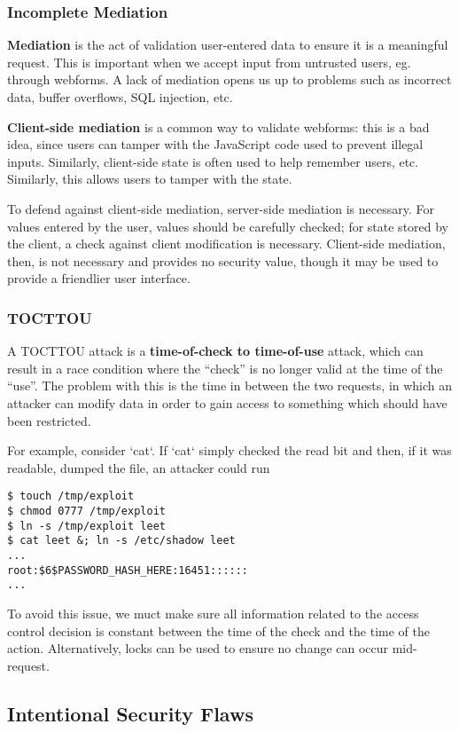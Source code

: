 \documentclass[12pt]{article}
\begin{document}
\subsubsection{Incomplete Mediation}
{\bf Mediation} is the act of validation user-entered data to ensure it is a meaningful request. This is important when we accept input from untrusted users, eg. through webforms. A lack of mediation opens us up to problems such as incorrect data, buffer overflows, SQL injection, etc.

{\bf Client-side mediation} is a common way to validate webforms: this is a bad idea, since users can tamper with the JavaScript code used to prevent illegal inputs. Similarly, client-side state is often used to help remember users, etc. Similarly, this allows users to tamper with the state.

To defend against client-side mediation, server-side mediation is necessary. For values entered by the user, values should be carefully checked; for state stored by the client, a check against client modification is necessary. Client-side mediation, then, is not necessary and provides no security value, though it may be used to provide a friendlier user interface.

\subsubsection{TOCTTOU}
A TOCTTOU attack is a {\bf time-of-check to time-of-use} attack, which can result in a race condition where the ``check'' is no longer valid at the time of the ``use''. The problem with this is the time in between the two requests, in which an attacker can modify data in order to gain access to something which should have been restricted.

For example, consider `cat`. If `cat` simply checked the read bit and then, if it was readable, dumped the file, an attacker could run

\begin{verbatim}
$ touch /tmp/exploit
$ chmod 0777 /tmp/exploit
$ ln -s /tmp/exploit leet
$ cat leet &; ln -s /etc/shadow leet
...
root:$6$PASSWORD_HASH_HERE:16451::::::
...
\end{verbatim}

To avoid this issue, we muct make sure all information related to the access control decision is constant between the time of the check and the time of the action. Alternatively, locks can be used to ensure no change can occur mid-request.

\subsection{Intentional Security Flaws}
\end{document}

